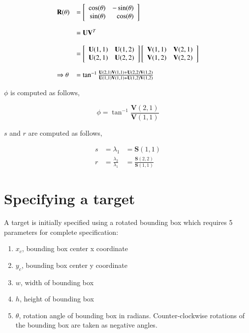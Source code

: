 \documentclass[12pt,letterpaper,doublespaced,ETD]{gt-ece-thesis} %
\begin{document}
\begin{Body}
\begin{equation}
\begin{array}{lllllll}
\mathbf{R}(\theta) &= \left[ \begin{array}{rr} \cos(\theta) & -\sin(\theta) \\ \sin(\theta) & \cos(\theta) \\ \end{array} \right] \\\\
&= \mathbf{U}\mathbf{V}^T \\\\
&= \left[\begin{array}{llll}\mathbf{U}(1,1) & \mathbf{U}(1,2)\\\mathbf{U}(2,1) & \mathbf{U}(2,2)\end{array}\right]\left[\begin{array}{llll}\mathbf{V}(1,1) & \mathbf{V}(2,1)\\\mathbf{V}(1,2) & \mathbf{V}(2,2)\end{array}\right] \\\\
\Rightarrow \theta &= \tan^{-1}\frac{\mathbf{U}(2,1)\mathbf{V}(1,1) + \mathbf{U}(2,2)\mathbf{V}(1,2)}{\mathbf{U}(1,1)\mathbf{V}(1,1) + \mathbf{U}(1,2)\mathbf{V}(1,2)}
\end{array}
\end{equation}

$\phi$ is computed as follows,

\begin{equation*}
\phi = \tan^{-1}\frac{\mathbf{V}(2,1)}{\mathbf{V}(1,1)}
\end{equation*}

$s$ and $r$ are computed as follows,

\begin{equation}
\begin{array}{llll}
s &= \lambda_1 &=  \mathbf{S}(1,1)\\
r &= \frac{\lambda_2}{\lambda_1} &= \frac{\mathbf{S}(2,2)}{\mathbf{S}(1,1)}
\end{array}
\end{equation}

\section{Specifying a target}
A target is initially specified using a rotated bounding box which requires 5 parameters for complete specification:

\begin{enumerate}
\item $x_c$, bounding box center x coordinate
\item $y_c$, bounding box center y coordinate
\item $w$, width of bounding box
\item $h$, height of bounding box
\item $\theta$, rotation angle of bounding box in radians.  Counter-clockwise rotations of the bounding box are taken as negative angles.  
\end{enumerate}
\newpage

\end{Body}
\end{document}
